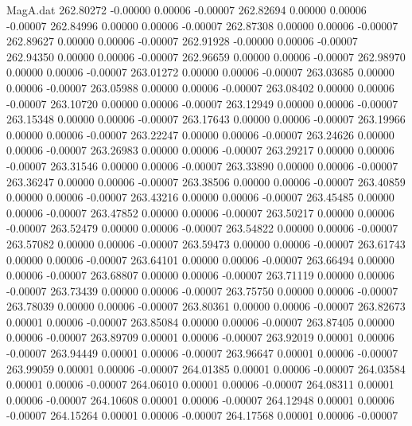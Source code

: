 \begin{filecontents}{MagA.dat}
 262.80272   -0.00000    0.00006   -0.00007
 262.82694    0.00000    0.00006   -0.00007
 262.84996    0.00000    0.00006   -0.00007
 262.87308    0.00000    0.00006   -0.00007
 262.89627    0.00000    0.00006   -0.00007
 262.91928   -0.00000    0.00006   -0.00007
 262.94350    0.00000    0.00006   -0.00007
 262.96659    0.00000    0.00006   -0.00007
 262.98970    0.00000    0.00006   -0.00007
 263.01272    0.00000    0.00006   -0.00007
 263.03685    0.00000    0.00006   -0.00007
 263.05988    0.00000    0.00006   -0.00007
 263.08402    0.00000    0.00006   -0.00007
 263.10720    0.00000    0.00006   -0.00007
 263.12949    0.00000    0.00006   -0.00007
 263.15348    0.00000    0.00006   -0.00007
 263.17643    0.00000    0.00006   -0.00007
 263.19966    0.00000    0.00006   -0.00007
 263.22247    0.00000    0.00006   -0.00007
 263.24626    0.00000    0.00006   -0.00007
 263.26983    0.00000    0.00006   -0.00007
 263.29217    0.00000    0.00006   -0.00007
 263.31546    0.00000    0.00006   -0.00007
 263.33890    0.00000    0.00006   -0.00007
 263.36247    0.00000    0.00006   -0.00007
 263.38506    0.00000    0.00006   -0.00007
 263.40859    0.00000    0.00006   -0.00007
 263.43216    0.00000    0.00006   -0.00007
 263.45485    0.00000    0.00006   -0.00007
 263.47852    0.00000    0.00006   -0.00007
 263.50217    0.00000    0.00006   -0.00007
 263.52479    0.00000    0.00006   -0.00007
 263.54822    0.00000    0.00006   -0.00007
 263.57082    0.00000    0.00006   -0.00007
 263.59473    0.00000    0.00006   -0.00007
 263.61743    0.00000    0.00006   -0.00007
 263.64101    0.00000    0.00006   -0.00007
 263.66494    0.00000    0.00006   -0.00007
 263.68807    0.00000    0.00006   -0.00007
 263.71119    0.00000    0.00006   -0.00007
 263.73439    0.00000    0.00006   -0.00007
 263.75750    0.00000    0.00006   -0.00007
 263.78039    0.00000    0.00006   -0.00007
 263.80361    0.00000    0.00006   -0.00007
 263.82673    0.00001    0.00006   -0.00007
 263.85084    0.00000    0.00006   -0.00007
 263.87405    0.00000    0.00006   -0.00007
 263.89709    0.00001    0.00006   -0.00007
 263.92019    0.00001    0.00006   -0.00007
 263.94449    0.00001    0.00006   -0.00007
 263.96647    0.00001    0.00006   -0.00007
 263.99059    0.00001    0.00006   -0.00007
 264.01385    0.00001    0.00006   -0.00007
 264.03584    0.00001    0.00006   -0.00007
 264.06010    0.00001    0.00006   -0.00007
 264.08311    0.00001    0.00006   -0.00007
 264.10608    0.00001    0.00006   -0.00007
 264.12948    0.00001    0.00006   -0.00007
 264.15264    0.00001    0.00006   -0.00007
 264.17568    0.00001    0.00006   -0.00007

\end{filecontents}
